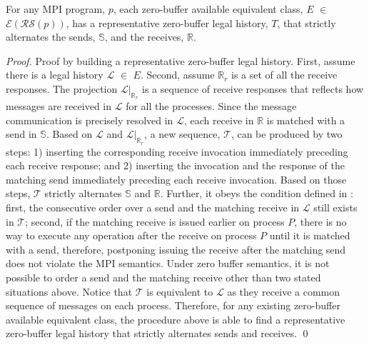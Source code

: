 
\begin{theorem}
For any MPI program, $\mathit{p}$, each zero-buffer available equivalent class, $\mathit{E}$ $\in$ $\mathcal{E}(\mathcal{RS}(\mathit{p}))$, has a representative zero-buffer legal history, $T$, that strictly alternates the sends, $\mathbb{S}$, and the receives, $\mathbb{R}$.
\end{theorem}

\begin{proof}
Proof by building a representative zero-buffer legal history. First, assume there is a legal history $\mathcal{L}$ $\in$ $\mathit{E}$. Second, assume $\mathbb{R}_r$ is a set of all the receive responses. The projection $\mathcal{L} | _{\mathbb{R}_r}$ is a sequence of receive responses that reflects how messages are received in $\mathcal{L}$ for all the processes. Since the message communication is precisely resolved in $\mathcal{L}$, each receive in $\mathbb{R}$ is matched with a send in $\mathbb{S}$. Based on $\mathcal{L}$ and $\mathcal{L} | _{\mathbb{R}_r}$, a new sequence, $\mathcal{T}$, can be produced by two steps: 1) inserting the corresponding receive invocation immediately preceding each receive response; and 2) inserting the invocation and the response of the matching send immediately preceding each receive invocation. Based on those steps, $\mathcal{T}$ strictly alternates $\mathbb{S}$ and $\mathbb{R}$. Further, it obeys the condition defined in : first, the consecutive order over a send and the matching receive in $\mathcal{L}$ still exists in $\mathcal{T}$; second, if the matching receive is issued earlier on process $P$, there is no way to execute any operation after the receive on process $P$ until it is matched with a send, therefore, postponing issuing the receive after the matching send does not violate the MPI semantics. Under zero buffer semantics, it is not possible to order a send and the matching receive other than two stated situations above. Notice that $\mathcal{T}$ is equivalent to $\mathcal{L}$ as they receive a common sequence of messages on each process. Therefore, for any existing zero-buffer available equivalent class, the procedure above is able to find a representative zero-buffer legal history that strictly alternates sends and receives. \qed
\end{proof}

